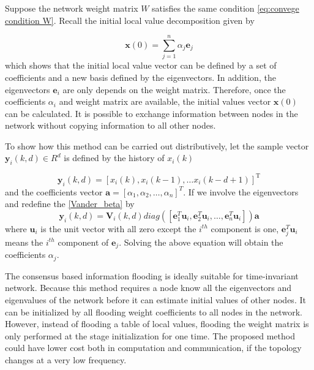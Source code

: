 Suppose the network weight matrix $W$ satisfies the same condition
\ref{eq:convege condition W}. Recall the initial local value decomposition
given by

\begin{equation}
\mathbf{x}\left(0\right)=\sum_{j=1}^{n}\alpha_{j}\mathbf{e}_{j}\label{eq:initial vector decompose-1}
\end{equation}
which shows that the initial local value vector can be defined by
a set of coefficients and a new basis defined by the eigenvectors.\textbf{
}In addition, the eigenvectors $\mathbf{e}_{i}$ are only depends
on the weight matrix. Therefore, once the coefficients $\alpha_{i}$
and weight matrix are available, the initial values vector $\mathbf{x}\left(0\right)$
can be calculated. It is possible to exchange information between
nodes in the network without copying information to all other nodes.

To show how this method can be carried out distributively, let the
sample vector $\mathbf{y}_{i}(k,d)\in R^{d}$ is defined by the history
of $x_{i}(k)$ 

\begin{equation}
\mathbf{y}_{i}(k,d)=\left[x_{i}(k),x_{i}(k-1),\ldots x_{i}(k-d+1)\right]^{\mathrm{T}}
\end{equation}
and the coefficients vector $\mathbf{a}=\left[\alpha_{1},\alpha_{2},\ldots,\alpha_{n}\right]^{T}$.
If we involve the eigenvectors and redefine the \eqref{Vander_beta}
by 
\begin{equation}
\mathbf{y}_{i}(k,d)=\mathbf{V}_{i}(k,d)diag\left(\left[\mathbf{e}_{1}^{T}\mathbf{u}_{i},\mathbf{e}_{2}^{T}\mathbf{u}_{i},\ldots,\mathbf{e}_{n}^{T}\mathbf{u}_{i}\right]\right)\mathbf{a}\label{eq:Vander_Eigen_ith_Alpha}
\end{equation}
where $\mathbf{u}_{i}$ is the unit vector with all zero except the
$i^{th}$ component is one, $\mathbf{e}_{j}^{T}\mathbf{u}_{i}$ means
the $i^{th}$ component of $\mathbf{e}_{j}$. Solving the above equation
will obtain the coefficients $\alpha_{j}$. 

The consensus based information flooding is ideally suitable for time-invariant
network. Because this method requires a node know all the eigenvectors
and eigenvalues of the network before it can estimate initial values
of other nodes. It can be initialized by all flooding weight coefficients
to all nodes in the network. However, instead of flooding a table
of local values, flooding the weight matrix is only performed at the
stage initialization for one time. The proposed method could have
lower cost both in computation and communication, if the topology
changes at a very low frequency.
